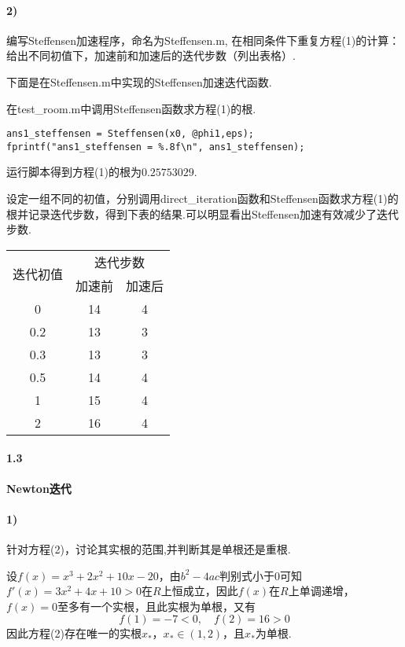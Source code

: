 \paragraph{2)} 编写Steffensen加速程序，命名为Steffensen.m, 在相同条件下重复方程(1)的计算：给出不同初值下，加速前和加速后的迭代步数（列出表格）.
\par 下面是在Steffensen.m中实现的Steffensen加速迭代函数.

\par 在test\_room.m中调用Steffensen函数求方程(1)的根.
\begin{lstlisting}
ans1_steffensen = Steffensen(x0, @phi1,eps);
fprintf("ans1_steffensen = %.8f\n", ans1_steffensen);
\end{lstlisting}
\par 运行脚本得到方程(1)的根为$0.25753029$.
\par 设定一组不同的初值，分别调用direct\_iteration函数和Steffensen函数求方程(1)的根并记录迭代步数，得到下表的结果.可以明显看出Steffensen加速有效减少了迭代步数.
\begin{table}[H]
\centering
\begin{tabular}{|c|c|c|}
\hline
\multirow{2}{*}{迭代初值} & \multicolumn{2}{c|}{迭代步数} \\ \cline{2-3} 
                      & 加速前         & 加速后         \\ \hline
0                     & 14            & 4           \\ \hline
0.2                   & 13            & 3            \\ \hline
0.3                   & 13            & 3            \\ \hline
0.5                   & 14            & 4            \\ \hline
1                     & 15            & 4            \\ \hline
2                     & 16            & 4            \\ \hline
\end{tabular}
\end{table}

\paragraph{1.3} \textbf{Newton迭代}
\paragraph{1)} 针对方程(2)，讨论其实根的范围,并判断其是单根还是重根.
\par 设$f(x) = x^3 + 2x^2 + 10x - 20$，由$b^2 - 4ac$判别式小于$0$可知$f'(x) = 3x^2 + 4x + 10 > 0$在$R$上恒成立，因此$f(x)$在$R$上单调递增，$f(x) = 0$至多有一个实根，且此实根为单根，又有
\[f(1) = -7 < 0, \quad f(2) = 16 > 0\]
因此方程(2)存在唯一的实根$x_*$，$x_* \in (1, 2)$，且$x_*$为单根.

